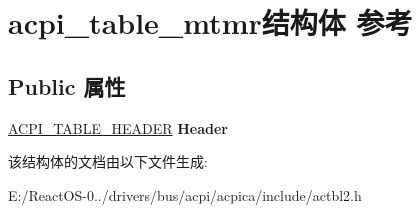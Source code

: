\hypertarget{structacpi__table__mtmr}{}\section{acpi\+\_\+table\+\_\+mtmr结构体 参考}
\label{structacpi__table__mtmr}
\subsection*{Public 属性}
\begin{DoxyCompactItemize}
\item 
\mbox{\label{structacpi__table__mtmr_a90eb18fbf652e72dc8123ccfdecdd04c}} 
\hyperlink{structacpi__table__header}{A\+C\+P\+I\+\_\+\+T\+A\+B\+L\+E\+\_\+\+H\+E\+A\+D\+ER} {\bfseries Header}
\end{DoxyCompactItemize}


该结构体的文档由以下文件生成\+:\begin{DoxyCompactItemize}
\item 
E\+:/\+React\+O\+S-\/0../drivers/bus/acpi/acpica/include/actbl2.\+h\end{DoxyCompactItemize}
